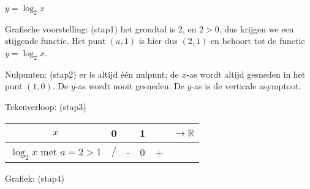 \begin{voorbeeld}
$y=\log_{2}x$

Grafische voorstelling: (stap1) het grondtal is 2, en $2>0$,
dus krijgen we een stijgende functie. Het punt $(a,1)$ is hier dus
$(2,1)$ en behoort tot de functie $y=\log_{2}x$.


Nulpunten: (stap2) er is altijd \'e\'en nulpunt; de
$x$-as wordt altijd gesneden in het punt $(1,0)$. De $y$-as wordt nooit
gesneden. De $y$-as is de verticale asymptoot.


Tekenverloop: (stap3) %
\begin{tabular}{c|ccccc}
	$x$ & 0 &  & 1 &  & $\longrightarrow\mathbb{R}$\\
	\hline 
	$\log_{2}x$ met $a=2>1$ & $/$ & - & 0 & + & \multicolumn{1}{c}{}\\
\end{tabular}

Grafiek: (stap4) 


\begin{figure}[H]
	\centering
	
\end{figure}

\end{voorbeeld}

